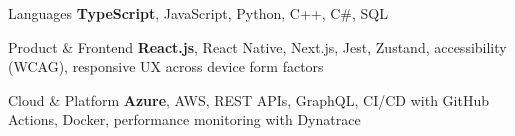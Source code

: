 
\begin{cvskills}

  \cvskill
  {Languages}
  {\textbf{TypeScript}, JavaScript, Python, C++, C\#, SQL}


  \cvskill
  {Product \& Frontend}
  {\textbf{React.js}, React Native, Next.js, Jest, Zustand, accessibility (WCAG), responsive UX across device form factors}

  \cvskill
  {Cloud \& Platform}
  {\textbf{Azure}, AWS, REST APIs, GraphQL, CI/CD with GitHub Actions, Docker, performance monitoring with Dynatrace}

\end{cvskills}
